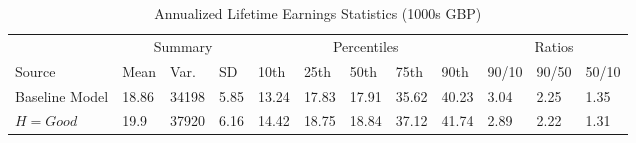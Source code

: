 \documentclass[border=3mm,preview]{standalone}\usepackage{booktabs}
\begin{document}
\begin{landscape}
\small
\begin{table} 
\center\caption*{Annualized Lifetime Earnings Statistics (1000s GBP)} 
\begin{tabular}{l | l l l | l l l l l | l l l} 
\toprule 
 & \multicolumn{3}{c}{Summary} & \multicolumn{5}{c}{Percentiles} & \multicolumn{3}{c}{Ratios} \\ 
Source & Mean & Var. & SD & 10th & 25th & 50th & 75th & 90th & 90/10 & 90/50 & 50/10 \\ 
\midrule 
Baseline Model & 18.86 & 34198 & 5.85 & 
        13.24 & 17.83 & 17.91 & 35.62 & 40.23 &
        3.04 & 2.25 & 1.35 \\ 
$H = Good$ & 19.9 & 37920 & 6.16 & 
        14.42 & 18.75 & 18.84 & 37.12 & 41.74 &
        2.89 & 2.22 
        & 1.31 \\ 
\bottomrule 
\end{tabular}
\end{table}
\end{landscape}
\end{document}
